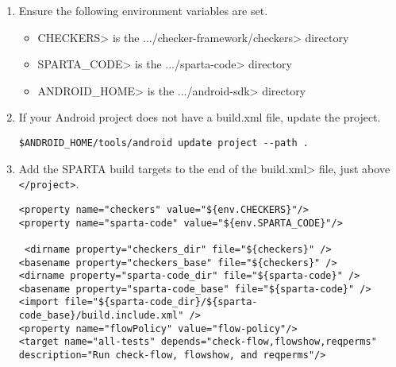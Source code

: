 \begin{enumerate}
\item
Ensure the following environment variables are set. 

\begin{itemize}
\item
\<CHECKERS> is the
\<.../checker-framework/checkers> directory

\item
\<SPARTA\_CODE> is the \<.../sparta-code> directory

\item
\<ANDROID\_HOME> is the \<.../android-sdk> directory

\end{itemize}

\item
If your Android project does not have a build.xml file, update the project.

\begin{Verbatim}
$ANDROID_HOME/tools/android update project --path .
\end{Verbatim}

\item
Add the SPARTA build targets to the end of the \<build.xml>
 file, just above \verb|</project>|.


\begin{Verbatim}
<property name="checkers" value="${env.CHECKERS}"/>
<property name="sparta-code" value="${env.SPARTA_CODE}"/>
	
 <dirname property="checkers_dir" file="${checkers}" />
<basename property="checkers_base" file="${checkers}" />
<dirname property="sparta-code_dir" file="${sparta-code}" />
<basename property="sparta-code_base" file="${sparta-code}" />
<import file="${sparta-code_dir}/${sparta-code_base}/build.include.xml" />
<property name="flowPolicy" value="flow-policy"/>
<target name="all-tests" depends="check-flow,flowshow,reqperms" description="Run check-flow, flowshow, and reqperms"/>

\end{Verbatim}

\end{enumerate}


